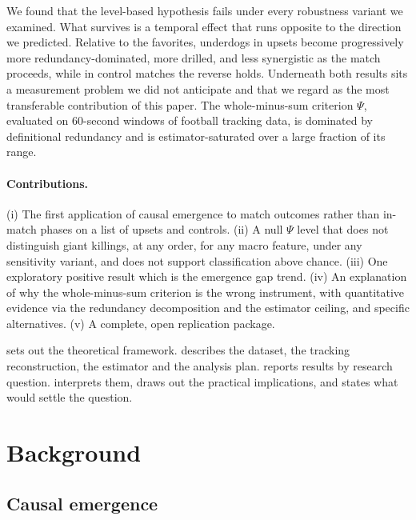 \documentclass[11pt,a4paper]{article}
\begin{document}
We found that the level-based hypothesis fails under
every robustness variant we examined. What survives is a temporal effect that runs
opposite to the direction we predicted. Relative to the favorites, underdogs in upsets
become progressively more redundancy-dominated, more drilled, and less synergistic
as the match proceeds, while in control matches the reverse holds. Underneath both
results sits a measurement problem we did not anticipate and that we regard as the most
transferable contribution of this paper. The whole-minus-sum criterion $\Psi$, evaluated
on 60-second windows of football tracking data, is dominated by definitional redundancy
and is estimator-saturated over a large fraction of its range. 

\paragraph{Contributions.} (i) The first application of causal emergence to match
outcomes rather than in-match phases on a list of upsets and
controls. (ii) A null $\Psi$ level that does not distinguish
giant killings, at any order, for any macro feature, under any sensitivity variant, and
does not support classification above chance. (iii) One exploratory positive result which is the
emergence gap trend. (iv) An explanation of
why the whole-minus-sum criterion is the wrong instrument, with quantitative
evidence via the redundancy decomposition and the estimator ceiling, and specific
alternatives. (v) A complete, open replication package.

 sets out the theoretical framework.  describes the
dataset, the tracking reconstruction, the estimator and the analysis plan.
 reports results by research question.  interprets
them, draws out the practical implications, and states what would settle the question.

\section{Background}
\label{sec:background}

\subsection{Causal emergence}
\end{document}
